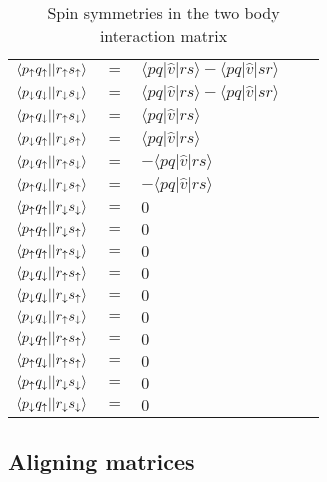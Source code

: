 \begin{table}[hbtp]
\centering
\caption{Spin symmetries in the two body interaction matrix}
\label{tab:symmetries_t2}
\begin{tabular}{lllll}
$\langle {p}_\uparrow {q}_\uparrow \vert \vert  {r}_\uparrow {s}_\uparrow \rangle $ & $=$ & $\langle pq \vert \hat{v} \vert rs \rangle - \langle pq \vert \hat{v} \vert sr \rangle$ \\  
$\langle {p}_\downarrow {q}_\downarrow \vert \vert  {r}_\downarrow {s}_\downarrow \rangle $ & $=$ & $\langle pq \vert \hat{v} \vert rs \rangle - \langle pq \vert \hat{v} \vert sr \rangle$ \\  
$\langle {p}_\uparrow {q}_\downarrow \vert \vert  {r}_\uparrow {s}_\downarrow \rangle $ & $=$ & $\langle pq \vert \hat{v} \vert rs \rangle$ \\  
$\langle {p}_\downarrow {q}_\uparrow \vert \vert  {r}_\downarrow {s}_\uparrow \rangle $ & $=$ & $\langle pq \vert \hat{v} \vert rs \rangle$ \\  
$\langle {p}_\downarrow {q}_\uparrow \vert \vert  {r}_\uparrow {s}_\downarrow \rangle $ & $=$ & $-\langle pq \vert \hat{v} \vert rs \rangle$ \\  
$\langle {p}_\uparrow {q}_\downarrow \vert \vert  {r}_\downarrow {s}_\uparrow \rangle $ & $=$ & $-\langle pq \vert \hat{v} \vert rs \rangle$ \\  
$\langle {p}_\uparrow {q}_\uparrow \vert \vert  {r}_\downarrow {s}_\downarrow \rangle $ & $=$ & $0$ \\  
$\langle {p}_\uparrow {q}_\uparrow \vert \vert  {r}_\downarrow {s}_\uparrow \rangle $ & $=$ & $0$ \\  
$\langle {p}_\uparrow {q}_\uparrow \vert \vert  {r}_\uparrow {s}_\downarrow \rangle $ & $=$ & $0$ \\  
$\langle {p}_\downarrow {q}_\downarrow \vert \vert  {r}_\uparrow {s}_\uparrow \rangle $ & $=$ & $0$ \\  
$\langle {p}_\downarrow {q}_\downarrow \vert \vert  {r}_\downarrow {s}_\uparrow \rangle $ & $=$ & $0$ \\  
$\langle {p}_\downarrow {q}_\downarrow \vert \vert  {r}_\uparrow {s}_\downarrow \rangle $ & $=$ & $0$ \\  
$\langle {p}_\downarrow {q}_\uparrow \vert \vert  {r}_\uparrow {s}_\uparrow \rangle $ & $=$ & $0$ \\  
$\langle {p}_\uparrow {q}_\downarrow \vert \vert  {r}_\uparrow {s}_\uparrow \rangle $ & $=$ & $0$ \\  
$\langle {p}_\uparrow {q}_\downarrow \vert \vert  {r}_\downarrow {s}_\downarrow \rangle $ & $=$ & $0$ \\  
$\langle {p}_\downarrow {q}_\uparrow \vert \vert  {r}_\downarrow {s}_\downarrow \rangle $ & $=$ & $0$ \\  
\end{tabular}
\end{table}


\subsection{Aligning matrices}

